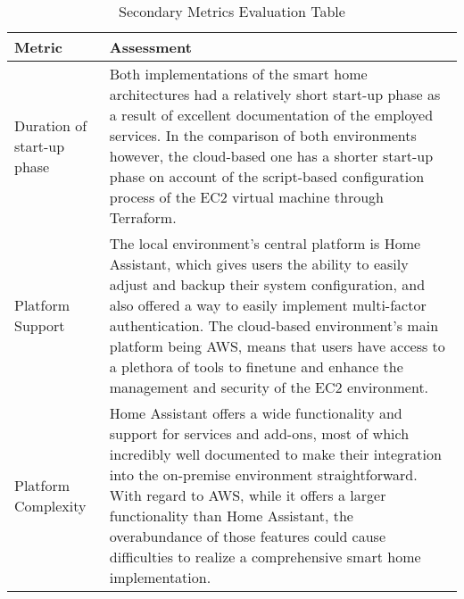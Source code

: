 \begin{table}[H]
    \centering
    \begin{tabular}{|p{4cm}|p{8cm}|}
        \hline
        Metric & Assessment \\
        \hline
        Duration of start-up phase & Both implementations of the smart home architectures had a relatively short start-up phase as a result of excellent documentation of the employed services. In the comparison of both environments however, the cloud-based one has a shorter start-up phase on account of the script-based configuration process of the EC2 virtual machine through Terraform. \\
        \hline
        Platform Support & The local environment's central platform is Home Assistant, which gives users the ability to easily adjust and backup their system configuration, and also offered a way to easily implement multi-factor authentication. The cloud-based environment's main platform being AWS, means that users have access to a plethora of tools to finetune and enhance the management and security of the EC2 environment. \\
        \hline
        Platform Complexity & Home Assistant offers a wide functionality and support for services and add-ons, most of which incredibly well documented to make their integration into the on-premise environment straightforward. With regard to AWS, while it offers a larger functionality than Home Assistant, the overabundance of those features could cause difficulties to realize a comprehensive smart home implementation. \\
        \hline
    \end{tabular}
    \caption{Secondary Metrics Evaluation Table}
\end{table}
